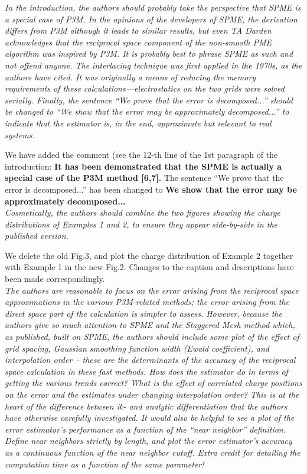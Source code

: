 \documentclass[a4paper]{article}
\begin{document}
\textit{ In the introduction, the authors should probably take the
  perspective that SPME is a special case of P3M.  In the opinions of
  the developers of SPME, the derivation differs from P3M although it
  leads to similar results, but even TA Darden acknowledges that the
  reciprocal space component of the non-smooth PME algorithm was
  inspired by P3M.  It is probably best to phrase SPME as such and not
  offend anyone.  The interlacing technique was first applied in the
  1970s, as the authors have cited.  It was originally a means of
  reducing the memory requirements of these
  calculations—electrostatics on the two grids were solved serially.
  Finally, the sentence ``We prove that the error is decomposed...''
  should be changed to ``We show that the error may be approximately
  decomposed...'' to indicate that the estimator is, in the end,
  approximate but relevant to real systems.
}

We have added the comment (see the 12-th line of the 1st paragraph
of the introduction:
\textbf{It has been demonstrated that the SPME is actually
  a special case of the P3M method [6,7].}
The sentence ``We prove that the error is decomposed...'' has been
changed to \textbf{We show that the error may be approximately
  decomposed...}
\\

\textit{ Cosmetically, the authors should combine the two figures
  showing the charge distributions of Examples 1 and 2, to ensure they
  appear side-by-side in the published version.
}

We delete the old Fig.3,
and plot the charge distribution of Example 2 together
with Example 1 in the new Fig.2. Changes to the caption and
descriptions have been made correspondingly.\\

\textit{
The authors are reasonable to focus on the error arising from the
reciprocal space approximations in the various P3M-related methods;
the error arising from the direct space part of the calculation is
simpler to assess.  However, because the authors give so much
attention to SPME and the Staggered Mesh method which, as published,
built on SPME, the authors should include some plot of the effect of
grid spacing, Gaussian smoothing function width (Ewald coefficient),
and interpolation order -- these are the determinants of the accuracy of
the reciprocal space calculation in these fast methods.  How does the
estimator do in terms of getting the various trends correct?  What is
the effect of correlated charge positions on the error and the
estimates under changing interpolation order?  This is at the heart of
the difference between ik- and analytic differentiation that the
authors have otherwise carefully investigated.  It would also be
helpful to see a plot of the error estimator’s performance as a
function of the “near neighbor” definition.  Define near neighbors
strictly by length, and plot the error estimator's accuracy as a
continuous function of the near neighbor cutoff.  Extra credit for
detailing the computation time as a function of the same parameter!
}
\end{document}
